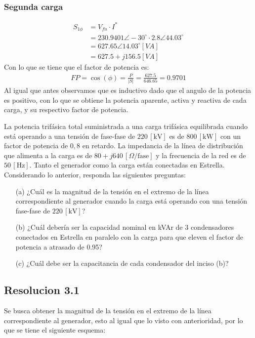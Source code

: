 \documentclass[
  11pt,
  letterpaper,
   addpoints,
   answers
  ]{exam}
\begin{document}
\begin{questions}
\begin{solution}
\subsubsection*{Segunda carga}
\begin{align}
    S_{1\phi} &= V_{fn} \cdot I^{*}\\
    &= 230.9401 \angle -30^{\circ} \cdot 2.8 \angle 44.03^{\circ}\\
    &= 627.65 \angle 14.03^{\circ} [VA]\\
    &= 627.5 + j 156.5 [VA]
\end{align}
Con lo que se tiene que el factor de potencia es:
\begin{align}
    FP = \cos(\phi) = \frac{P}{|S|} = \frac{627.5}{646.65} = 0.9701
\end{align}
Al igual que antes observamos que es inductivo dado que el angulo de la potencia es positivo, con lo que se obtiene la potencia aparente, activa y reactiva de cada carga, y su respectivo factor de potencia.
\end{solution}
\question La potencia trifásica total suministrada a una carga trifásica equilibrada cuando está operando a una tensión de fase-fase de \(220 \, [\text{kV}]\) es de \(800 \, [\text{kW}]\) con un factor de potencia de \(0,8\) en retardo. La impedancia de la línea de distribución que alimenta a la carga es de \(80 + j640 \, [\Omega/\text{fase}]\) y la frecuencia de la red es de \(50 \, [\text{Hz}]\). Tanto el generador como la carga están conectadas en Estrella. Considerando lo anterior, responda las siguientes preguntas:
\begin{enumerate}
    \item[(a)] ¿Cuál es la magnitud de la tensión en el extremo de la línea correspondiente al generador cuando la carga está operando con una tensión fase-fase de \(220 \, [\text{kV}]\)?
    \item[(b)] ¿Cuál debería ser la capacidad nominal en kVAr de 3 condensadores conectados en Estrella en paralelo con la carga para que eleven el factor de potencia a atrasado de 0.95?
    \item[(c)] ¿Cuál debe ser la capacitancia de cada condensador del inciso (b)?
\end{enumerate}
\begin{solution}
    \subsection*{Resolucion 3.1}
    Se busca obtener la magnitud de la tensión en el extremo de la línea correspondiente al generador, esto al igual que lo visto con anterioridad, por lo que se tiene el siguiente esquema:
    \begin{center}
        \begin{circuitikz}


\end{circuitikz}
\end{center}
\end{solution}
\end{questions}
\end{document}

